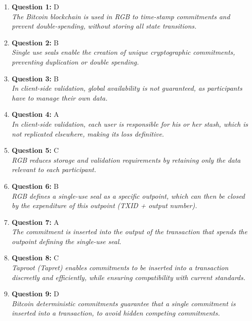 \documentclass[12pt,a4paper]{article}
\begin{document}
\begin{enumerate}
\item \textbf{Question 1:} D
\\ \textit{The Bitcoin blockchain is used in RGB to time-stamp commitments and prevent double-spending, without storing all state transitions.}

\item \textbf{Question 2:} B
\\ \textit{Single use seals enable the creation of unique cryptographic commitments, preventing duplication or double spending.}

\item \textbf{Question 3:} B
\\ \textit{In client-side validation, global availability is not guaranteed, as participants have to manage their own data.}

\item \textbf{Question 4:} A
\\ \textit{In client-side validation, each user is responsible for his or her stash, which is not replicated elsewhere, making its loss definitive.}

\item \textbf{Question 5:} C
\\ \textit{RGB reduces storage and validation requirements by retaining only the data relevant to each participant.}

\item \textbf{Question 6:} B
\\ \textit{RGB defines a single-use seal as a specific outpoint, which can then be closed by the expenditure of this outpoint (TXID + output number).}

\item \textbf{Question 7:} A
\\ \textit{The commitment is inserted into the output of the transaction that spends the outpoint defining the single-use seal.}

\item \textbf{Question 8:} C
\\ \textit{Taproot (Tapret) enables commitments to be inserted into a transaction discreetly and efficiently, while ensuring compatibility with current standards.}

\item \textbf{Question 9:} D
\\ \textit{Bitcoin deterministic commitments guarantee that a single commitment is inserted into a transaction, to avoid hidden competing commitments.}


\end{enumerate}
\end{document}
